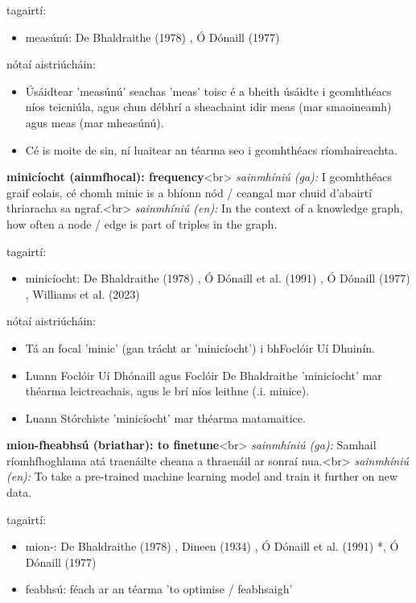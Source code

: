 \documentclass{article}
\begin{document}
tagairtí:
\begin{itemize}
	\item measúnú: De Bhaldraithe (1978) \cite{de-bhaldraithe}, Ó Dónaill (1977) \cite{odonaill}
\end{itemize}

nótaí aistriúcháin:
\begin{itemize}
	\item Úsáidtear 'measúnú' seachas 'meas' toisc é a bheith úsáidte i gcomhthéacs níos teicniúla, agus chun débhrí a sheachaint idir meas (mar smaoineamh) agus meas (mar mheasúnú).
	\item Cé is moite de sin, ní luaitear an téarma seo i gcomhthéacs ríomhaireachta.
\end{itemize}


\textbf{minicíocht (ainmfhocal): frequency}<br>
\textit{sainmhíniú (ga):} I gcomhthéacs graif eolais, cé chomh minic is a bhíonn nód / ceangal mar chuid d'abairtí thriaracha sa ngraf.<br>
\textit{sainmhíniú (en):} In the context of a knowledge graph, how often a node / edge is part of triples in the graph.

tagairtí:
\begin{itemize}
	\item minicíocht: De Bhaldraithe (1978) \cite{de-bhaldraithe}, Ó Dónaill et al. (1991) \cite{focloir-beag}, Ó Dónaill (1977) \cite{odonaill}, Williams et al. (2023) \cite{storchiste}
\end{itemize}

nótaí aistriúcháin:
\begin{itemize}
	\item Tá an focal 'minic' (gan trácht ar 'minicíocht') i bhFoclóir Uí Dhuinín.
	\item Luann Foclóir Uí Dhónaill agus Foclóir De Bhaldraithe 'minicíocht' mar théarma leictreachais, agus le brí níos leithne (.i. minice).
	\item Luann Stórchiste 'minicíocht' mar théarma matamaitice.
\end{itemize}


\textbf{mion-fheabhsú (briathar): to finetune}<br>
\textit{sainmhíniú (ga):} Samhail ríomhfhoghlama atá traenáilte cheana a thraenáil ar sonraí nua.<br>
\textit{sainmhíniú (en):} To take a pre-trained machine learning model and train it further on new data.

tagairtí:
\begin{itemize}
	\item mion-: De Bhaldraithe (1978) \cite{de-bhaldraithe}, Dineen (1934) \cite{dineen}, Ó Dónaill et al. (1991) \cite{focloir-beag}*, Ó Dónaill (1977) \cite{odonaill}
	\item feabhsú: féach ar an téarma 'to optimise / feabhsaigh'
\end{itemize}
\end{document}
